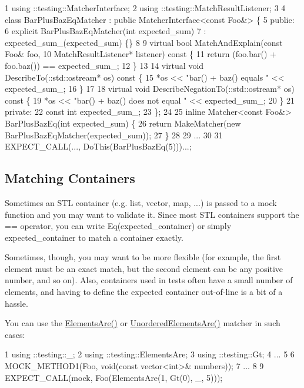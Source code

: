 \begin{DoxyCode}
1 using ::testing::MatcherInterface;
2 using ::testing::MatchResultListener;
3 
4 class BarPlusBazEqMatcher : public MatcherInterface<const Foo&> \{
5  public:
6   explicit BarPlusBazEqMatcher(int expected\_sum)
7       : expected\_sum\_(expected\_sum) \{\}
8 
9   virtual bool MatchAndExplain(const Foo& foo,
10                                MatchResultListener* listener) const \{
11     return (foo.bar() + foo.baz()) == expected\_sum\_;
12   \}
13 
14   virtual void DescribeTo(::std::ostream* os) const \{
15     *os << "bar() + baz() equals " << expected\_sum\_;
16   \}
17 
18   virtual void DescribeNegationTo(::std::ostream* os) const \{
19     *os << "bar() + baz() does not equal " << expected\_sum\_;
20   \}
21  private:
22   const int expected\_sum\_;
23 \};
24 
25 inline Matcher<const Foo&> BarPlusBazEq(int expected\_sum) \{
26   return MakeMatcher(new BarPlusBazEqMatcher(expected\_sum));
27 \}
28 
29 ...
30 
31   EXPECT\_CALL(..., DoThis(BarPlusBazEq(5)))...;
\end{DoxyCode}


\subsection*{Matching Containers}

Sometimes an S\+TL container (e.\+g. list, vector, map, ...) is passed to a mock function and you may want to validate it. Since most S\+TL containers support the {\ttfamily ==} operator, you can write {\ttfamily Eq(expected\+\_\+container)} or simply {\ttfamily expected\+\_\+container} to match a container exactly.

Sometimes, though, you may want to be more flexible (for example, the first element must be an exact match, but the second element can be any positive number, and so on). Also, containers used in tests often have a small number of elements, and having to define the expected container out-\/of-\/line is a bit of a hassle.

You can use the {\ttfamily \hyperlink{namespacetesting_a79cf4ae694bf8231dcf283b325405f27}{Elements\+Are()}} or {\ttfamily \hyperlink{namespacetesting_a8622c12aadfa0e60f7d68683eeb21115}{Unordered\+Elements\+Are()}} matcher in such cases\+:


\begin{DoxyCode}
1 using ::testing::\_;
2 using ::testing::ElementsAre;
3 using ::testing::Gt;
4 ...
5 
6   MOCK\_METHOD1(Foo, void(const vector<int>& numbers));
7 ...
8 
9   EXPECT\_CALL(mock, Foo(ElementsAre(1, Gt(0), \_, 5)));
\end{DoxyCode}


